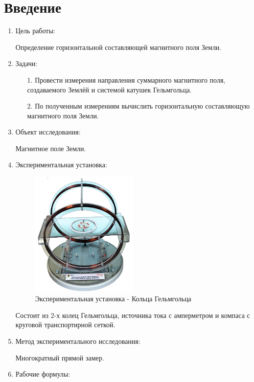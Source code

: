 \documentclass[12pt, a4paper]{article}
\begin{document}
\section{Введение}
\begin{enumerate}
\item Цель работы:

Определение горизонтальной составляющей магнитного поля Земли.

\item Задачи:
	\begin{enumerate}
		\item[1.]  Провести измерения направления суммарного магнитного поля, создаваемого Землёй и системой катушек Гельмгольца.
		\item[2.] По полученным измерениям вычислить горизонтальную составляющую магнитного поля Земли.
	\end{enumerate}
		
\item Объект исследования:

Магнитное поле Земли.

\item Экспериментальная установка:
\begin{figure}[H]
\includegraphics[width=0.5\textwidth]{../helmholtz.png}
\centering
\caption{Экспериментальная установка - Кольца Гельмгольца}
\end{figure}

Состоит из 2-х колец Гельмгольца, источника тока с амперметром и компаса с круговой транспортирной сеткой.

\item Метод экспериментального исследования:

Многократный прямой замер.

\item Рабочие формулы:


\end{enumerate}
\end{document}
